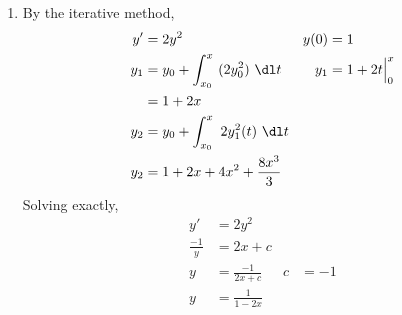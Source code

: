 \begin{enumerate}
\begin{enumerate}
              \item By the iterative method,
                    \begin{align}
                        y'    & = 2y^{2}                                         &
                        y(0)  & = 1                                                \\
                        y_{1} & = y_{0} + \int_{x_{0}}^{x}\ (2y_{0}^{2})\ \dl t  &
                        y_{1} & = 1 + 2t\Big|_{0}^{x}                              \\
                              & = 1 + 2x                                           \\
                        y_{2} & = y_{0} + \int_{x_{0}}^{x}\ 2y_{1}^{2}(t)\ \dl t   \\
                        y_{2} & = 1 + 2x + 4x^{2} + \frac{8x^{3}}{3}
                    \end{align}
                    Solving exactly,
                    \begin{align}
                        y'           & = 2y^{2}                      \\
                        \frac{-1}{y} & = 2x+c                        \\
                        y            & = \frac{-1}{2x+c}  & c & = -1 \\
                        y            & = \frac{1}{1 - 2x}
                    \end{align}
                    \begin{figure}[H]
                        \centering
\end{figure}
\end{enumerate}
\end{enumerate}
